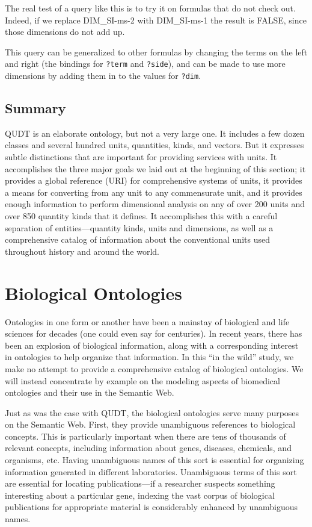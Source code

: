 The real test of a query like this is to try it on formulas that do not
check out. Indeed, if we replace DIM\_SI-ms-2 with DIM\_SI-ms-1 the result 
is FALSE, since those dimensions do not
add up.

This query can be generalized to other formulas by changing the terms on 
the left and right (the bindings for \texttt{?term} and \texttt{?side}), and can
be made to use more dimensions by adding them in to the values for \texttt{?dim}.




\subsection{Summary}

QUDT is an elaborate ontology, but not a very large one. It includes a
few dozen classes and several hundred units, quantities, kinds, and vectors.
But it expresses subtle distinctions that are important for providing
services with units. It accomplishes the three major goals we laid out
at
the beginning of this section; it provides a global reference (URI) for
comprehensive systems of units, it provides a means for converting from
any unit to any commensurate unit, and it provides enough information to
perform dimensional analysis on any of over 200 units and over 850 quantity kinds that it defines.
It accomplishes this with a careful separation of entities---quantity kinds,
units and dimensions, as well as a comprehensive catalog of information
about the conventional units used throughout history and around the
world.

\section{Biological Ontologies}
\label{section:Bio}

Ontologies in one form or another have been a mainstay of biological and
life sciences for decades (one could even say for centuries). In recent
years, there has been an explosion of biological information, along with
a corresponding interest in ontologies to help organize that
information. In this ``in the wild'' study, we make no attempt to
provide a comprehensive catalog of biological ontologies. We will
instead concentrate by example on the modeling aspects of biomedical
ontologies and their use in the Semantic Web.

Just as was the case with QUDT, the biological ontologies serve many
purposes on the Semantic Web. First, they provide unambiguous references
to biological concepts. This is particularly important when there are
tens of thousands of relevant concepts, including information about
genes, diseases, chemicals, and organisms, etc. Having unambiguous names
of this sort is essential for organizing information generated in
different laboratories. Unambiguous terms of this sort are essential for
locating publications---if a researcher suspects something interesting
about a particular gene, indexing the vast corpus of biological
publications for appropriate material is considerably enhanced by
unambiguous names.

